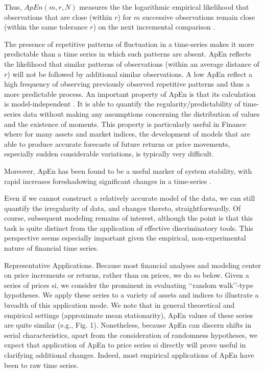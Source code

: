 \documentclass[12pt]{article}
\begin{document}
Thus, $ApEn(m,r,N)$ measures the the logarithmic empirical likelihood that observations that are close (within $r$) for $m$ successive observations remain close (within the same tolerance $r$) on the next incremental
comparison \cite{pincus92, delgado}. 

The presence of repetitive patterns of fluctuation  in a time-series makes it more predictable than a time series in which such patterns are absent. ApEn reflects the likelihood that similar patterns of observations (within an average distance of $r$) will not be followed by additional similar observations. A low ApEn reflect a high frequency of observing previously observed repetitive patterns and thus a more predictable process. An important property of ApEn is that its calculation is model-independent \cite{pincus04}. It is able to quantify the regularity/predictability of time-series data without making any assumptions concerning the distribution of values and the existence of moments. This property is particularly useful in Finance where for many assets and market indices, the development of models that are able to produce accurate forecasts of future returns or price movements, especially sudden considerable variations, is typically very difficult. 

Moreover, ApEn has been found to be a useful marker of system stability,
with rapid increases foreshadowing significant changes in a time-series \cite{pincus04}. 

Even if we cannot construct a relatively accurate model of the data,
we can still quantify the irregularity of data, and changes thereto,
straightforwardly. Of course, subsequent modeling remains of
interest, although the point is that this task is quite distinct from the
application of effective discriminatory tools. This perspective seems
especially important given the empirical, non-experimental nature
of financial time series.



Representative Applications. Because most financial analyses and
modeling center on price increments or returns, rather than on
prices, we do so below. Given a series of prices {si}, we consider the
prominent in evaluating ‘‘random walk’’-type hypotheses. We apply
these series to a variety of assets and indices to illustrate a breadth
of this application mode. We note that in general theoretical and
empirical settings (approximate mean stationarity), ApEn values of
these series are quite similar (e.g., Fig. 1).
Nonetheless, because ApEn can discern shifts in serial characteristics, apart from the consideration of randomness hypotheses,
we expect that application of ApEn to price series {si} directly will
prove useful in clarifying additional changes. Indeed, most empirical applications of ApEn have been to raw time series.
\end{document}
